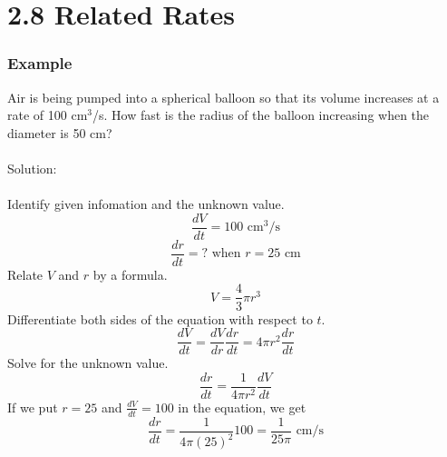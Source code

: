 %
%

\section*{2.8 Related Rates}

\subsubsection*{Example}

Air is being pumped into a spherical balloon so that its volume increases at a rate of 100 cm\(^3\)/s. How fast is the radius of the balloon increasing when the diameter is 50 cm?
\\\\
Solution:
\\\\
Identify given infomation and the unknown value.
$$ \frac{dV}{dt} = 100 \text{ cm}^3/\text{s} $$
$$ \frac{dr}{dt} =\text{? when } r = 25 \text{ cm} $$
Relate \(V\) and \(r\) by a formula.
$$ V=\frac{4}{3} \pi r^3 $$
Differentiate both sides of the equation with respect to \(t\).
$$ \frac{dV}{dt}=\frac{dV}{dr}\frac{dr}{dt}=4 \pi r^2 \frac{dr}{dt} $$
Solve for the unknown value.
$$ \frac{dr}{dt} = \frac{1}{4 \pi r^2} \frac{dV}{dt} $$
If we put \(r=25\) and \(\frac{dV}{dt}=100\) in the equation, we get
$$ \frac{dr}{dt} = \frac{1}{4 \pi {(25)}^2}100=\frac{1}{25 \pi} \text{ cm/s} $$ 
